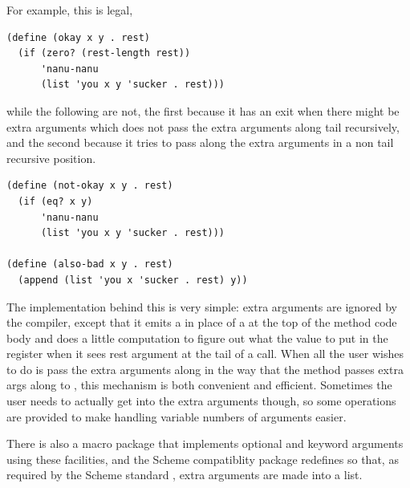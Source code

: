 For example, this is legal,
\begin{verbatim}
(define (okay x y . rest)
  (if (zero? (rest-length rest))
      'nanu-nanu
      (list 'you x y 'sucker . rest)))
\end{verbatim}
while the following are not, the first because it has an exit when
there might be extra arguments which does not pass the extra arguments
along tail recursively, and the second because it tries to pass along
the extra arguments in a non tail recursive position.
\begin{verbatim}
(define (not-okay x y . rest)
  (if (eq? x y)
      'nanu-nanu
      (list 'you x y 'sucker . rest)))

(define (also-bad x y . rest)
  (append (list 'you x 'sucker . rest) y))
\end{verbatim}

The implementation behind this is very simple: extra arguments are
ignored by the compiler, except that it emits a 
in place of a  at the top of the method code body and
does a little computation to figure out what the value to put in the
 register when it sees rest argument at the tail of a call.
When all the user wishes to do is pass the extra arguments along in
the way that the  method passes extra args along to
, this mechanism is both convenient and efficient.
Sometimes the user needs to actually get into the extra arguments
though, so some operations are provided to make handling variable
numbers of arguments easier.



There is also a macro package that implements optional and keyword
arguments using these facilities, and the Scheme compatiblity package
redefines  so that, as required by the Scheme standard
\citep{R3RS}, extra arguments are made into a list.
